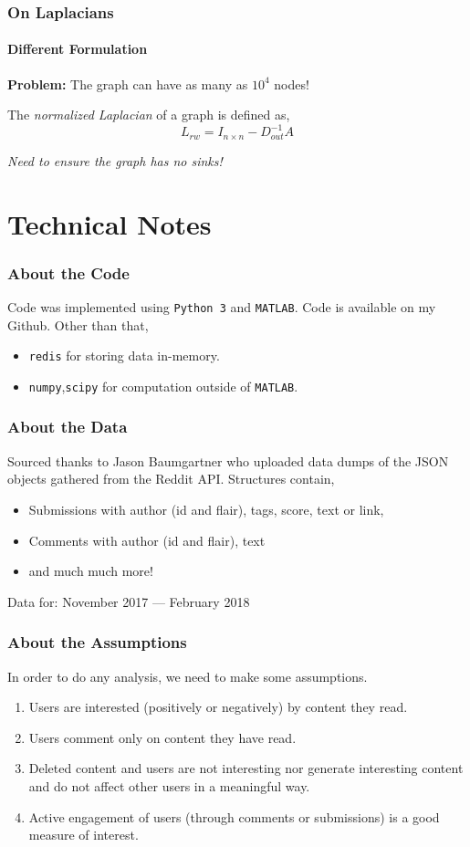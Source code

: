 \documentclass[frame number]{beamer}
\begin{document}
\begin{frame}
  \frametitle{On Laplacians}
  \framesubtitle{Different Formulation}
  \textbf{Problem:} The graph can have as many as \(10^4\) nodes!
  \pause
  \begin{definition}
    The \emph{normalized Laplacian} of a graph is defined as,
    \[
      L_{rw} = I_{n\times n} - D_{out}^{-1} A
    \]
  \end{definition}
  \pause
  \emph{Need to ensure the graph has no sinks!}
\end{frame}

\section{Technical Notes}
\begin{frame}
  \frametitle{About the Code}
  Code was implemented using \texttt{Python 3} and \texttt{MATLAB}. Code is available on my Github. Other than that,
  \begin{itemize}
    \item \texttt{redis} for storing data in-memory.
    \item \texttt{numpy},\texttt{scipy} for computation outside of \texttt{MATLAB}.
  \end{itemize}
\end{frame}
\begin{frame}
  \frametitle{About the Data}
  Sourced thanks to Jason Baumgartner who uploaded data dumps of the JSON objects gathered from the Reddit API. Structures contain,
  \begin{itemize}
    \item{Submissions with author (id and flair), tags, score, text or link,}
    \item{Comments with author (id and flair), text}
    \item{and much much more!}
  \end{itemize}
  \pause
  Data for: November 2017 --- February 2018
\end{frame}
\begin{frame}
  \frametitle{About the Assumptions}
  In order to do any analysis, we need to make some assumptions.
  \begin{enumerate}
    \item<1->{Users are interested (positively or negatively) by content they read.}
    \item<2->{Users comment only on content they have read.}
    \item<3->{Deleted content and users are not interesting nor generate interesting content and do not affect other users in a meaningful way.}
    \item<4->{Active engagement of users (through comments or submissions) is a good measure of interest.}
  \end{enumerate}
\end{frame}
\end{document}
